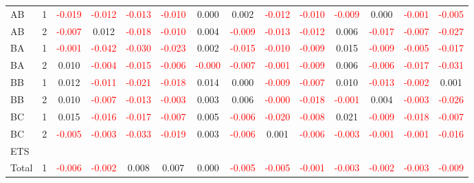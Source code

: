 \begin{table}[!htb]
{\begin{tabular}{llcccccccccccc}
AB & 1 & \textcolor{red}{-0.019} & \textcolor{red}{-0.012} & \textcolor{red}{-0.013} & \textcolor{red}{-0.010} & 0.000 & 0.002 & \textcolor{red}{-0.012} & \textcolor{red}{-0.010} & \textcolor{red}{-0.009} & 0.000 & \textcolor{red}{-0.001} & \textcolor{red}{-0.005}\\
AB & 2 & \textcolor{red}{-0.007} & 0.012 & \textcolor{red}{-0.018} & \textcolor{red}{-0.010} & 0.004 & \textcolor{red}{-0.009} & \textcolor{red}{-0.013} & \textcolor{red}{-0.012} & 0.006 & \textcolor{red}{-0.017} & \textcolor{red}{-0.007} & \textcolor{red}{-0.027}\\
BA & 1 & \textcolor{red}{-0.001} & \textcolor{red}{-0.042} & \textcolor{red}{-0.030} & \textcolor{red}{-0.023} & 0.002 & \textcolor{red}{-0.015} & \textcolor{red}{-0.010} & \textcolor{red}{-0.009} & 0.015 & \textcolor{red}{-0.009} & \textcolor{red}{-0.005} & \textcolor{red}{-0.017}\\
BA & 2 & 0.010 & \textcolor{red}{-0.004} & \textcolor{red}{-0.015} & \textcolor{red}{-0.006} & \textcolor{red}{-0.000} & \textcolor{red}{-0.007} & \textcolor{red}{-0.001} & \textcolor{red}{-0.009} & 0.006 & \textcolor{red}{-0.006} & \textcolor{red}{-0.017} & \textcolor{red}{-0.031}\\
BB & 1 & 0.012 & \textcolor{red}{-0.011} & \textcolor{red}{-0.021} & \textcolor{red}{-0.018} & 0.014 & 0.000 & \textcolor{red}{-0.009} & \textcolor{red}{-0.007} & 0.010 & \textcolor{red}{-0.013} & \textcolor{red}{-0.002} & 0.001\\
BB & 2 & 0.010 & \textcolor{red}{-0.007} & \textcolor{red}{-0.013} & \textcolor{red}{-0.003} & 0.003 & 0.006 & \textcolor{red}{-0.000} & \textcolor{red}{-0.018} & \textcolor{red}{-0.001} & 0.004 & \textcolor{red}{-0.003} & \textcolor{red}{-0.026}\\
BC & 1 & 0.015 & \textcolor{red}{-0.016} & \textcolor{red}{-0.017} & \textcolor{red}{-0.007} & 0.005 & \textcolor{red}{-0.006} & \textcolor{red}{-0.020} & \textcolor{red}{-0.008} & 0.021 & \textcolor{red}{-0.009} & \textcolor{red}{-0.018} & \textcolor{red}{-0.007}\\
BC & 2 & \textcolor{red}{-0.005} & \textcolor{red}{-0.003} & \textcolor{red}{-0.033} & \textcolor{red}{-0.019} & 0.003 & \textcolor{red}{-0.006} & 0.001 & \textcolor{red}{-0.006} & \textcolor{red}{-0.003} & \textcolor{red}{-0.001} & \textcolor{red}{-0.001} & \textcolor{red}{-0.016}\\
\hline
ETS &  &  &  &  &  &  &  &  &  &  &  &  & \\
\hline
Total & 1 & \textcolor{red}{-0.006} & \textcolor{red}{-0.002} & 0.008 & 0.007 & 0.000 & \textcolor{red}{-0.005} & \textcolor{red}{-0.005} & \textcolor{red}{-0.001} & \textcolor{red}{-0.003} & \textcolor{red}{-0.002} & \textcolor{red}{-0.003} & \textcolor{red}{-0.009}\\

\end{tabular}}
\end{table}
